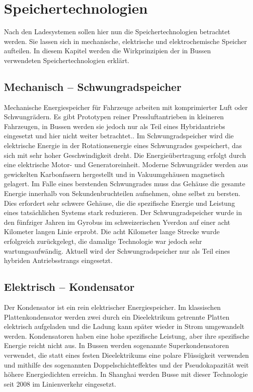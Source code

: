 \chapter{Speichertechnologien} %
Nach den Ladesystemen sollen hier nun die Speichertechnologien betrachtet werden. Sie lassen sich in mechanische, elektrische und elektrochemische Speicher aufteilen. In diesem Kapitel werden die Wirkprinzipien der in Bussen verwendeten Speichertechnologien erklärt.\\
\section{Mechanisch – Schwungradspeicher} %
Mechanische Energiespeicher für Fahrzeuge arbeiten mit komprimierter Luft oder Schwungrädern. Es gibt Prototypen reiner Pressluftantrieben in kleineren Fahrzeugen, in Bussen werden sie jedoch nur als Teil eines Hybridantriebs eingesetzt und hier nicht weiter betrachtet.\cite{Sebastian-Naumann:2014}. Im Schwungradspeicher wird die elektrische Energie in der Rotationsenergie eines Schwungrades gespeichert, das sich mit sehr hoher Geschwindigkeit dreht. Die Energieübertragung erfolgt durch eine elektrische Motor- und Generatoreinheit. Moderne Schwungräder werden aus gewickelten Karbonfasern hergestellt und in Vakuumgehäusen magnetisch gelagert. Im Falle eines berstenden Schwungrades muss das Gehäuse die gesamte Energie innerhalb von Sekundenbruchteilen aufnehmen, ohne selbst zu bersten. Dies erfordert sehr schwere Gehäuse, die die spezifische Energie und Leistung eines tatsächlichen Systems stark reduzieren. Der Schwungradspeicher wurde in den fünfziger Jahren im Gyrobus im schweizerischen Yverdon auf einer acht Kilometer langen Linie erprobt. Die acht Kilometer lange Strecke wurde erfolgreich zurückgelegt, die damalige Technologie war jedoch sehr wartungsaufwändig. Aktuell wird der Schwungradspeicher nur als Teil eines hybriden Antriebsstrangs eingesetzt.
\section{Elektrisch – Kondensator} %
Der Kondensator ist ein rein elektrischer Energiespeicher. Im klassischen Plattenkondensator werden zwei durch ein Dieelektrikum getrennte Platten elektrisch aufgeladen und die Ladung kann später wieder in Strom umgewandelt werden. Kondensatoren haben eine hohe spezifische Leistung, aber ihre spezifische Energie reicht nicht aus. In Bussen werden sogenannte Superkondensatoren verwendet, die statt eines festen Dieelektrikums eine polare Flüssigkeit verwenden und mithilfe des sogenannten Doppelschichteffektes und der Pseudokapazität weit höhere Energiedichten erreichn. In Shanghai werden Busse mit dieser Technologie seit 2008 im Linienverkehr eingesetzt.
